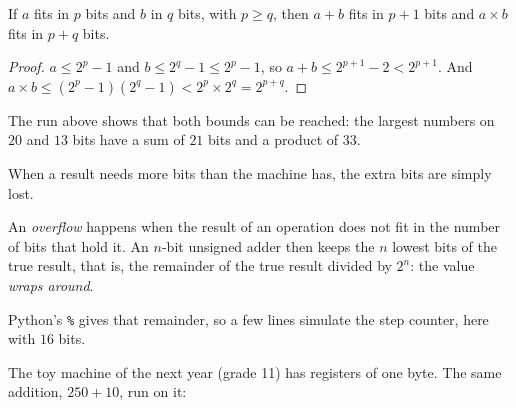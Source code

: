 \label{out:g10:machine-integers:bits-needed}

\begin{proposition}\label{prop:g10:machine-integers:sum-product}
If $a$ fits in $p$ bits and $b$ in $q$ bits, with $p \ge q$, then $a + b$ fits in $p + 1$ bits and $a \times b$ fits in
$p + q$ bits.
\end{proposition}

\begin{proof}
$a \le 2^p - 1$ and $b \le 2^q - 1 \le 2^p - 1$, so $a + b \le 2^{p+1} - 2 < 2^{p+1}$. And
$a \times b \le (2^p - 1)(2^q - 1) < 2^p \times 2^q = 2^{p+q}$.
\end{proof}

The run above shows that both bounds can be reached: the largest numbers on $20$ and $13$ bits have a sum of $21$
bits and a product of $33$.

When a result needs more bits than the machine has, the extra bits are simply lost.

\begin{definition}[Overflow]\label{def:g10:machine-integers:overflow}
An \emph{overflow} happens when the result of an operation does not fit in the number of bits that
hold it. An $n$-bit unsigned adder then keeps the $n$ lowest bits of the true result, that is, the remainder of the
true result divided by $2^n$: the value \emph{wraps around}.
\end{definition}

Python's \texttt{\%} gives that remainder, so a few lines simulate the step counter, here with $16$ bits.

\label{lst:g10:machine-integers:wrap}

\label{out:g10:machine-integers:wrap}

The toy machine of the next year (grade 11) has registers of one byte. The same addition, $250 + 10$, run on it:

\label{lst:g10:machine-integers:toy-wrap}

